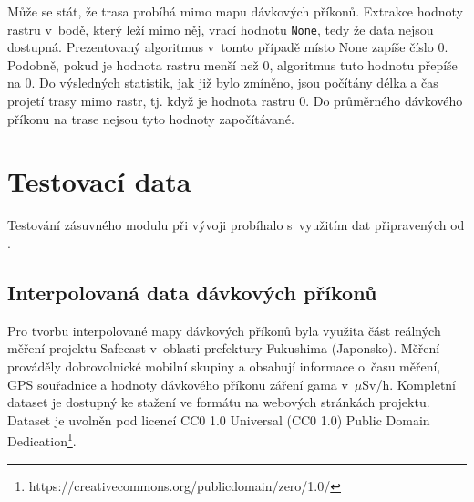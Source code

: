 		\begin{algorithm}                     
		\begin{algorithmic} [1]  

			\ELSE
			\ENDIF			
			
			\ENDIF
		\ENDFOR
		
	\end{algorithmic}
\end{algorithm}     

Může se stát, že trasa probíhá mimo mapu dávkových příkonů. Extrakce hodnoty rastru v~bodě, který leží mimo něj, vrací hodnotu \texttt{None}, tedy že data nejsou dostupná. Prezentovaný algoritmus v~tomto případě místo None zapíše číslo 0. Podobně, pokud je hodnota rastru menší než 0, algoritmus tuto hodnotu přepíše na 0. Do výsledných statistik, jak již bylo zmíněno, jsou počítány délka a čas projetí trasy mimo rastr, tj. když je hodnota rastru 0. Do průměrného dávkového příkonu na trase nejsou tyto hodnoty započítávané. 


\section{Testovací data}
Testování zásuvného modulu při vývoji probíhalo s~využitím dat připravených od .

\subsection{Interpolovaná data dávkových příkonů}
Pro tvorbu interpolované mapy dávkových příkonů byla využita část reálných měření projektu Safecast v~oblasti prefektury Fukushima (Japonsko). Měření prováděly dobrovolnické mobilní skupiny a obsahují informace o~času měření, GPS souřadnice a hodnoty dávkového příkonu záření gama v~$\mu$Sv/h. Kompletní dataset je dostupný ke stažení ve formátu  na webových stránkách projektu. Dataset je uvolněn pod licencí CC0 1.0 Universal (CC0 1.0) Public Domain Dedication\footnote{https://creativecommons.org/publicdomain/zero/1.0/}. 

